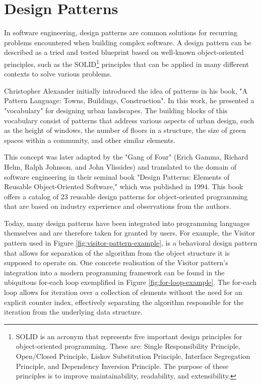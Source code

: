 \section{Design Patterns}
    In software engineering, design patterns are common solutions for recurring problems encountered when building complex software. A design pattern can be described as a tried and tested blueprint based on well-known object-oriented principles, such as the SOLID\footnote{SOLID is an acronym that represents five important design principles for object-oriented programming. These are: Single Responsibility Principle, Open/Closed Principle, Liskov Substitution Principle, Interface Segregation Principle, and Dependency Inversion Principle. The purpose of these principles is to improve maintainability, readability, and extensibility.} principles that can be applied in many different contexts to solve various problems.

    Christopher Alexander initially introduced the idea of patterns in his book, "A Pattern Language: Towns, Buildings, Construction"\cite{alexander1977pattern}. In this work, he presented a "vocabulary" for designing urban landscapes. The building blocks of this vocabulary consist of patterns that address various aspects of urban design, such as the height of windows, the number of floors in a structure, the size of green spaces within a community, and other similar elements.

    This concept was later adapted by the "Gang of Four" (Erich Gamma, Richard Helm, Ralph Johnson, and John Vlissides) and translated to the domain of software engineering in their seminal book "Design Patterns: Elements of Reusable Object-Oriented Software," which was published in 1994\cite{gamma1994design}. This book offers a catalog of 23 reusable design patterns for object-oriented programming that are based on industry experience and observations from the authors.

    Today, many design patterns have been integrated into programming languages themselves and are therefore taken for granted by users. For example, the Visitor pattern used in Figure \ref{fig:visitor-pattern-example}, is a behavioral design pattern that allows for separation of the algorithm from the object structure it is supposed to operate on. One concrete realisation of the Visitor pattern's integration into a modern programming framework can be found in the ubiquitous for-each loop exemplified in Figure \ref{fig:for-loop-example}. The for-each loop allows for iteration over a collection of elements without the need for an explicit counter index, effectively separating the algorithm responsible for the iteration from the underlying data structure.


